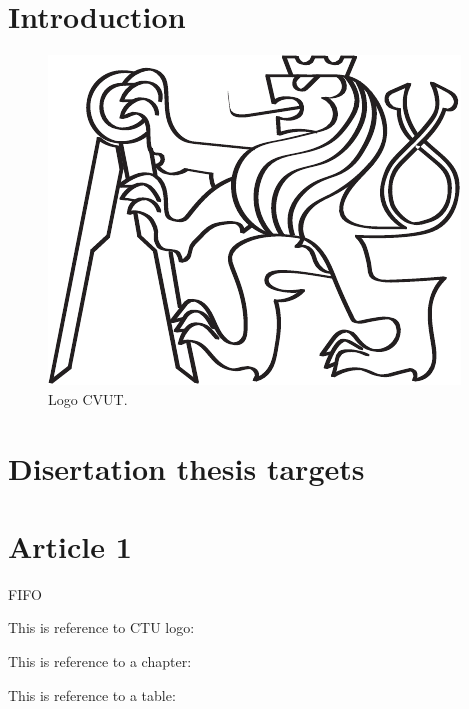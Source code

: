 \chapter{Introduction} \label{sec:introdution}
\lipsum 

\begin{figure}[h]
	\centering
	\includegraphics[width=0.5\linewidth]{images/LogoCVUT.pdf}
	\caption{Logo CVUT. }
	\label{fig:cvut}
\end{figure}

\chapter{Disertation thesis targets} 
\lipsum 



\chapter{Article 1} 
\lipsum 
\gls{FIFO}

This is reference to CTU logo: 

This is reference to a chapter: 

This is reference to a table: 




